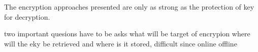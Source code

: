 The encryption approaches presented are only as strong as the protection of key for decryption.

two important quesions have to be asks
what will be target of encrypion
where will the eky be retrieved and where is it stored, difficult since online offline
